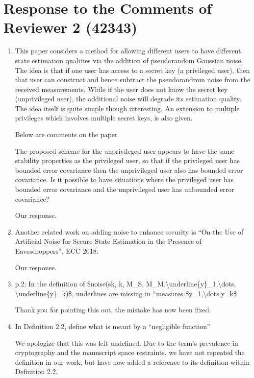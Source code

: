 \documentclass[a4paper]{scrartcl}
\newenvironment{rebuttal}{\begin{enumerate}[label={\color{grey}\thesection.\arabic{enumi}},leftmargin=0pt,ref=\thesection.\arabic{enumi}]}{\end{enumerate}}
\newcommand{\reviewtext}[1]{{\color{nblue} #1}}
\begin{document}
\section*{Response to the Comments of Reviewer 2 (42343)}
\def\thesection{R2}
\begin{rebuttal}
\item \reviewtext{This paper considers a method for allowing different users to have different state estimation qualities via the addition of pseudorandom Gaussian noise. The idea is that if one user has access to a secret key (a privileged user), then that user can construct and hence subtract the pseudorandrom noise from the received measurements. While if the user does not know the secret key (unprivileged user), the additional noise will degrade its estimation quality. The idea itself is quite simple though interesting. An extension to multiple privileges which involves multiple secret keys, is also given. 

Below are comments on the paper

The proposed scheme for the unprivileged user appears to have the same stability properties as the privileged user, so that if the privileged user has bounded error covariance then the unprivileged user also has bounded error covariance. Is it possible to have situations where the privileged user has bounded error covariance and the unprivileged user has unbounded error covariance?}

Our response.

\item \reviewtext{Another related work on adding noise to enhance security is ``On the Use of Artificial Noise for Secure State Estimation in the Presence of Eavesdroppers'', ECC 2018.}

Our response.

\item \reviewtext{p.2: In the definition of \$noise(sk, k, M\_S, M\_M,\textbackslash underline\{y\}\_1,\textbackslash dots, \textbackslash underline\{y\}\_k)\$, underlines are missing in ``measures \$y\_1,\textbackslash dots,y\_k\$}

Thank you for pointing this out, the mistake has now been fixed.

\item \reviewtext{In Definition 2.2, define what is meant by a ``negligible function''}

We apologize that this was left undefined. Due to the term's prevalence in cryptography and the manuscript space restraints, we have not repeated the definition in our work, but have now added a reference to its definition within Definition 2.2.


\end{rebuttal}
\end{document}
